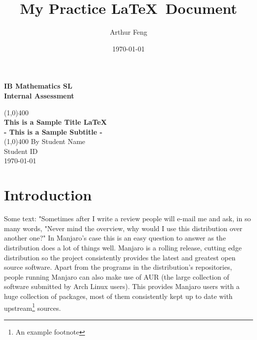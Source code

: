 \documentclass[11pt]{article}
\begin{document}
	
\begin{titlepage}
\begin{center}
\vspace*{1cm}  %
\Large{\textbf{IB Mathematics SL}}\\
\Large{\textbf{Internal Assessment}}\\
\vfill  %
		

\line(1,0){400}\\ [1mm] %

\huge{\textbf{This is a Sample Title  \LaTeX }} \\ [3mm]
\Large{\textbf{- This is a Sample Subtitle -}}\\ [1mm]
\line(1,0){400}
\vfill
By Student Name\\
Student ID \\
\today %

\end{center}
\end{titlepage}


\tableofcontents
\thispagestyle{empty} %
\clearpage %



\setcounter{page}{1} %

\title{My Practice \LaTeX \  Document}
\author{Arthur Feng}
\date{\today}
\maketitle 

\section{Introduction}

Some text: "Sometimes after I write a review people will e-mail me and ask\cite{DBHS1}, in so many words, "Never mind the overview, why would I use this distribution over another one?" In Manjaro's case this is an easy question to answer as the distribution does a lot of things well. Manjaro is a rolling release, cutting edge distribution so the project consistently provides the latest and greatest open source software. Apart from the programs in the distribution's repositories, people running Manjaro can also make use of AUR (the large collection of software submitted by Arch Linux users). This provides Manjaro users with a huge collection of packages, most of them consistently kept up to date with upstream\footnote{An example footnote} sources.\\
\end{document}
